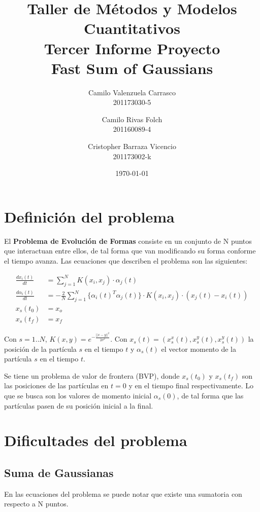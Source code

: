 \documentclass[letter, 10pt]{article}
\begin{document}
\title{ Taller de Métodos y Modelos Cuantitativos \\ Tercer Informe Proyecto \\ Fast Sum of Gaussians  }
\author{Camilo Valenzuela Carrasco\\ 201173030-5
\and
Camilo Rivas Folch \\ 201160089-4
\and
Cristopher Barraza Vicencio \\201173002-k}
\date{\today}
\maketitle

\section{Definición del problema}

El \textbf{Problema de Evolución de Formas} consiste en un conjunto de N puntos que interactuan entre ellos, de tal forma que van modificando su forma conforme el tiempo avanza. Las ecuaciones que describen el problema son las siguientes:

\begin{align}
    \frac{dx_i(t)}{dt} &= \sum_{j=1}^N K(x_i, x_j)\cdot \alpha_j(t) \label{edo}\\
    \frac{d\alpha_i(t)}{dt} &= -\frac{2}{N} \sum_{j=1}^N \{\alpha_i(t)^T \alpha_j(t) \} \cdot K(x_i, x_j) \cdot (x_j(t) - x_i(t)) \\
    x_s(t_0) &= x_o \\
    x_s(t_f) &= x_f
\end{align}

Con $s = 1..N$, $K(x, y) = e^{-\frac{|| x - y ||^2}{2\sigma^2}}$. Con $x_s(t) = (x_s^x(t), x_s^y(t), x_s^y(t))$ la posición de la partícula $s$ en el tiempo $t$ y $\alpha_s(t)$ el vector momento de la partícula $s$ en el tiempo $t$.

Se tiene un problema de valor de frontera (BVP), donde $x_s(t_0)$ y $x_s(t_f)$ son las posiciones de las partículas en $t = 0$ y en el tiempo final respectivamente. Lo que se busca son los valores de momento inicial $\alpha_s(0)$, de tal forma que las partículas pasen de su posición inicial a la final.


\newpage
\section{Dificultades del problema}

\subsection{Suma de Gaussianas}
En las ecuaciones del problema se puede notar que existe una sumatoria con respecto a N puntos.
\end{document}
